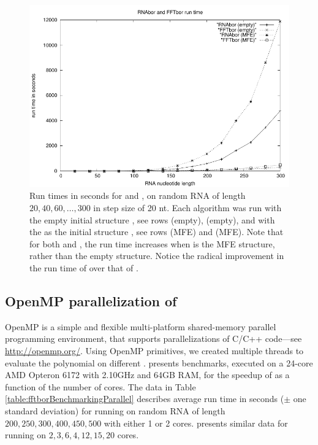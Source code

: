 \begin{figure}[!ht]
\centering
\includegraphics[width=.9\textwidth]{Figures/FFTbor/rnaborfftborRunTimeEvan.pdf}
\caption[Run times in seconds for \rnabor and \fftbor, on random RNA
of length $20,40,60,\dots,300$ in step size of 20 nt]{Run times in seconds for \rnabor and \fftbor, on random RNA
of length $20,40,60,\dots,300$ in step size of 20 nt. Each algorithm
was run with the empty initial structure \strSt, see rows
\rnabor (empty), \fftbor (empty), and with the \mfes as the initial structure
\strSt, see rows
\rnabor (MFE) and \fftbor (MFE). Note that for both \rnabor
and \fftbor, the run time increases when \strSt is the MFE structure,
rather than the empty structure. Notice the radical improvement in the
run time of \fftbor over that of \rnabor.
}
\label{fig:fftbor:benchmarking}
\end{figure}

\subsection{OpenMP parallelization of \fftbor}
\label{subsec:fftbor:openmp}

OpenMP is a simple and flexible
multi-platform shared-memory parallel programming environment, that supports
parallelizations of C/C++ code---see \url{http://openmp.org/}.
Using OpenMP primitives, we created multiple threads to evaluate the polynomial
\fullZx on different \nRoUs. 
presents benchmarks, executed on
a 24-core AMD Opteron 6172 with 2.10GHz and 64GB RAM, for the speedup
of \fftbor as a function of the number of cores.
The data in Table \ref{table:fftborBenchmarkingParallel} describes average
run time in seconds ($\pm$ one standard deviation) for running \fftbor
on random RNA of length $200,250,300,400,450,500$ with either 1 or 2 cores.
presents similar data for running
\fftbor on $2,3,6,4,12,15,20$ cores.


